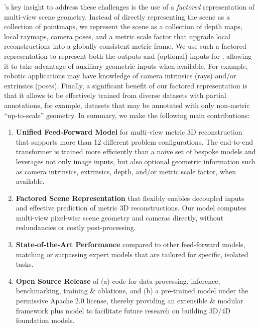 \coolname's key insight to address these challenges is the use of a \emph{factored} representation of multi-view scene geometry.
Instead of directly representing the scene as a collection of pointmaps, we represent the scene as a collection of depth maps, local raymaps, camera poses, and a metric scale factor that upgrade local reconstructions into a globally consistent metric frame.
We use such a factored representation to represent both the outputs and (optional) inputs for \coolname, allowing it to take advantage of auxiliary geometric inputs when available.
For example, robotic applications \cite{HuXJFPKKXZFZOKASJBWSWKXB2023, KeethKJYSRL2024, ho2024map, AlamaBHKQWHKS2025} may have knowledge of camera intrinsics (rays) and/or extrinsics (poses).
Finally, a significant benefit of our factored representation is that it allows \coolname to be effectively trained from diverse datasets with partial annotations, for example, datasets that may be annotated with only non-metric ``up-to-scale'' geometry.
In summary, we make the following main contributions:
\begin{enumerate}
    \item \textbf{Unified Feed-Forward Model}
    for multi-view metric 3D reconstruction that supports more than 12 different problem configurations.
    The end-to-end transformer is trained more efficiently than a naive set of bespoke models and leverages not only image inputs, but also optional geometric information such as camera intrinsics, extrinsics, depth, and/or metric scale factor, when available.

    \vspace{0.6em}

    \item \textbf{Factored Scene Representation}
    that flexibly enables decoupled inputs and effective prediction of metric 3D reconstructions.
    Our model computes multi-view pixel-wise scene geometry and cameras directly, without redundancies or costly post-processing. 

    \vspace{0.6em}

    \item \textbf{State-of-the-Art Performance}
    compared to other feed-forward models, matching or surpassing expert models that are tailored for specific, isolated tasks.

    \vspace{0.6em}
    
    \item \textbf{Open Source Release}
    of (a) code for data processing, inference, benchmarking, training \& ablations, and (b) a pre-trained \coolname model under the permissive Apache 2.0 license, thereby providing an extensible \& modular framework plus model to facilitate future research on building 3D/4D foundation models.

\end{enumerate}
 







